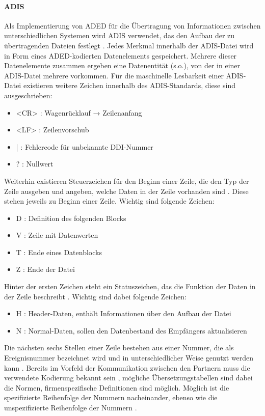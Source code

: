 \paragraph{ADIS}
Als Implementierung von ADED für die Übertragung von Informationen zwischen unterschiedlichen Systemen wird ADIS verwendet, das den Aufbau der zu übertragenden Dateien festlegt \autocite{landeskontrollverband_nrw_e.v._lkv_????}. Jedes Merkmal innerhalb der ADIS-Datei wird in Form eines ADED-kodierten Datenelements gespeichert. Mehrere dieser Datenelemente zusammen ergeben eine Datenentität (s.o.), von der in einer ADIS-Datei mehrere vorkommen. Für die maschinelle Lesbarkeit einer ADIS-Datei existieren weitere Zeichen innerhalb des ADIS-Standards, diese sind ausgeschrieben:
\begin{itemize}
	\item <CR> : Wagenrücklauf → Zeilenanfang \autocite[5]{n.n._adis/aded_2015}
	\item <LF> : Zeilenvorschub \autocite[5]{n.n._adis/aded_2015}
	\item | : Fehlercode für unbekannte DDI-Nummer \autocite[5]{n.n._adis/aded_2015}
	\item ? : Nullwert \autocite[5]{n.n._adis/aded_2015}
\end{itemize}
Weiterhin existieren Steuerzeichen für den Beginn einer Zeile, die den Typ der Zeile ausgeben und angeben, welche Daten in der Zeile vorhanden sind \autocite[6]{n.n._adis/aded_2015}. Diese stehen jeweils zu Beginn einer Zeile. Wichtig sind folgende Zeichen:
\begin{itemize}
	\item D : Definition des folgenden Blocks \autocite[6]{n.n._adis/aded_2015}
	\item V : Zeile mit Datenwerten \autocite[6]{n.n._adis/aded_2015}
	\item T : Ende eines Datenblocks \autocite[6]{n.n._adis/aded_2015}
	\item Z : Ende der Datei \autocite[6]{n.n._adis/aded_2015}
\end{itemize}
Hinter der ersten Zeichen steht ein Statuszeichen, das die Funktion der Daten in der Zeile beschreibt \autocite[7]{n.n._adis/aded_2015}. Wichtig sind dabei folgende Zeichen:
\begin{itemize}
	\item H : Header-Daten, enthält Informationen über den Aufbau der Datei \autocite[8]{n.n._adis/aded_2015}
	\item N : Normal-Daten, sollen den Datenbestand des Empfängers aktualisieren \autocite[8]{n.n._adis/aded_2015}
\end{itemize}
Die nächsten sechs Stellen einer Zeile bestehen aus einer Nummer, die als Ereignisnummer bezeichnet wird und in unterschiedlicher Weise genutzt werden kann \autocite[9]{n.n._adis/aded_2015}. Bereits im Vorfeld der Kommunikation zwischen den Partnern muss die verwendete Kodierung bekannt sein \autocite[9]{n.n._adis/aded_2015}, mögliche Übersetzungstabellen sind dabei die Normen, firmenspezifische Definitionen sind möglich. Möglich ist die spezifizierte Reihenfolge der Nummern nacheinander, ebenso wie die unspezifizierte Reihenfolge der Nummern \autocite[9]{n.n._adis/aded_2015}.


